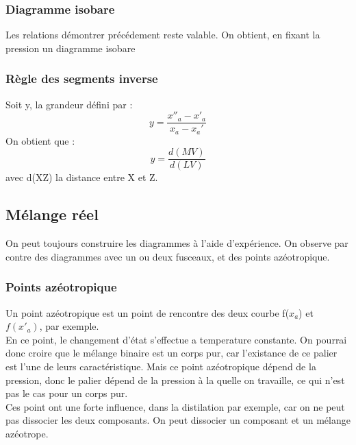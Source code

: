 \subsubsection{Diagramme isobare}
Les relations démontrer précédement reste valable. On obtient, en fixant la pression un diagramme isobare
\subsubsection{Règle des segments inverse}
Soit y, la grandeur défini par : 
$$y = \dfrac{x''_a-x'_a}{x_a-x_a'}$$
On obtient que : 
$$y=\dfrac{d(MV)}{d(LV)}$$
avec d(XZ) la distance entre X et Z.
\subsection{Mélange réel}
On peut toujours construire les diagrammes à l'aide d'expérience. On observe par contre des diagrammes avec un ou deux fusceaux, et des points azéotropique.
\subsubsection{Points azéotropique}
Un point azéotropique est un point de rencontre des deux courbe f($x_a$) et $f(x'_a)$, par exemple.\\
En ce point, le changement d'état s'effectue a temperature constante. On pourrai donc croire que le mélange binaire est un corps pur, car l'existance de ce palier est l'une de leurs caractéristique. Mais ce point azéotropique dépend de la pression, donc le palier dépend de la pression à la quelle on travaille, ce qui n'est pas le cas pour un corps pur.\\
Ces point ont une forte influence, dans la distilation par exemple, car on ne peut pas dissocier les deux composants. On peut dissocier un composant et un mélange azéotrope.
